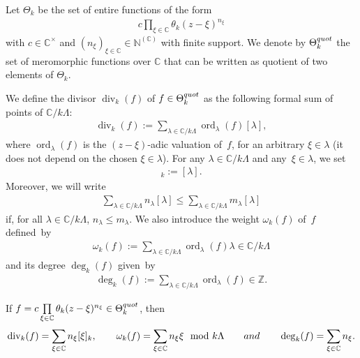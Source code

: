 \documentclass[10pt,a4paper]{amsart}
\numberwithin{equation}{section}
\newcommand{\divi}[1]{\operatorname{div}_{#1}}
\newcommand{\weight}[1]{\omega_{#1}}
\newcommand{\degr}[1]{\deg_{#1}}
\newcommand{\prodtheta}[1]{\Theta_{#1}}
\newcommand{\quotprodtheta}[1]{\Theta_{#1}^{\rm quot}}
\begin{document}
Let $\prodtheta{k}$ be the set of entire functions of the form
\begin{gather*}
c  \prod\limits_{\xi \in \mathbb C} \theta_{k}(z-\xi)^{n_{\xi}}
\end{gather*}
with $c \in \mathbb C^{\times}$ and $(n_{\xi})_{\xi \in \mathbb C}\in \mathbb N^{(\mathbb C)}$ with f\/inite support.
We denote by $\quotprodtheta{k}$ the set of meromorphic functions over $\mathbb C$ that can be written as quotient of
two elements of $\prodtheta{k}$.

We def\/ine the divisor $\divi{k} (f)$ of $ f \in \quotprodtheta{k} $ as the following formal sum of points of $\mathbb
C/k\Lambda$:
\begin{gather*}
\divi{k} (f):= \sum\limits_{\lambda \in \mathbb C/k\Lambda} \operatorname{ord}_{\lambda}(f) [\lambda],
\end{gather*}
where $\operatorname{ord}_{\lambda}(f)$ is the $(z-\xi)$-adic valuation of~$f$, for an arbitrary $\xi \in \lambda$ (it
does not depend on the chosen $\xi \in \lambda$).
For any $\lambda \in \mathbb C/k\Lambda$ and any~$\xi \in \lambda$, we set
\begin{gather*}
[\xi]_k:=[\lambda].
\end{gather*}
Moreover, we will write
\begin{gather*}
\sum\limits_{\lambda \in \mathbb C/k\Lambda} n_{\lambda} [\lambda] \leq \sum\limits_{\lambda \in \mathbb C/k\Lambda}
m_{\lambda} [\lambda]
\end{gather*}
if, for all $\lambda \in \mathbb C/k\Lambda$, $n_{\lambda} \leq m_{\lambda}$.
We also introduce the weight $\weight{k} (f)$ of~$f$ def\/ined~by
\begin{gather*}
\weight{k}(f):=\sum\limits_{\lambda \in \mathbb C/k\Lambda} \operatorname{ord}_{\lambda}(f) \lambda \in \mathbb
C/k\Lambda
\end{gather*}
and its degree $\degr{k} (f)$ given~by
\begin{gather*}
\degr{k} (f):=\sum\limits_{\lambda \in \mathbb C/k\Lambda} \operatorname{ord}_{\lambda}(f) \in \mathbb Z.
\end{gather*}

If $f= c  \prod\limits_{\xi \in \mathbb C} \theta_{k}(z-\xi)^{n_{\xi}} \in \quotprodtheta{k}$, then
\begin{gather*}
\divi{k} (f) = \sum\limits_{\xi \in \mathbb C} n_{\xi} [\xi]_{k},
\qquad
\weight{k}(f) = \sum\limits_{\xi \in \mathbb C} n_\xi \xi \mod k\Lambda
\qquad {\rm and} \qquad
\degr{k} (f)=\sum\limits_{\xi \in \mathbb C} n_\xi.
\end{gather*}
\end{document}
